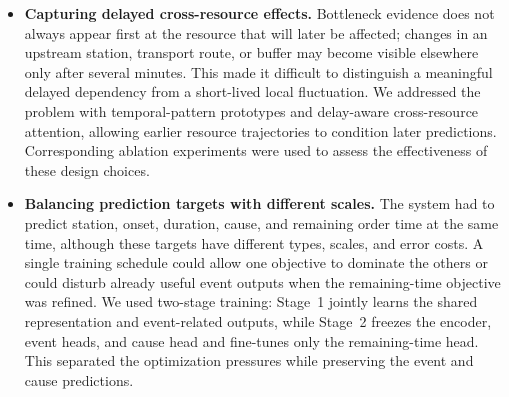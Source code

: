 \begin{itemize}[leftmargin=1.7em,itemsep=0.55\baselineskip,topsep=0.35\baselineskip]
\item \textbf{Capturing delayed cross-resource effects.} Bottleneck evidence does not always appear first at the resource that will later be affected; changes in an upstream station, transport route, or buffer may become visible elsewhere only after several minutes. This made it difficult to distinguish a meaningful delayed dependency from a short-lived local fluctuation. We addressed the problem with temporal-pattern prototypes and delay-aware cross-resource attention, allowing earlier resource trajectories to condition later predictions. Corresponding ablation experiments were used to assess the effectiveness of these design choices.

\item \textbf{Balancing prediction targets with different scales.} The system had to predict station, onset, duration, cause, and remaining order time at the same time, although these targets have different types, scales, and error costs. A single training schedule could allow one objective to dominate the others or could disturb already useful event outputs when the remaining-time objective was refined. We used two-stage training: Stage~1 jointly learns the shared representation and event-related outputs, while Stage~2 freezes the encoder, event heads, and cause head and fine-tunes only the remaining-time head. This separated the optimization pressures while preserving the event and cause predictions.
\end{itemize}
